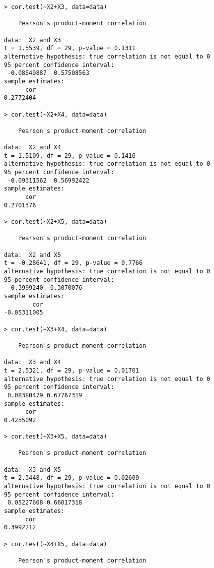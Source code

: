 \begin{enumerate}
\begin{lstlisting}
> cor.test(~X2+X3, data=data)

	Pearson's product-moment correlation

data:  X2 and X3
t = 1.5539, df = 29, p-value = 0.1311
alternative hypothesis: true correlation is not equal to 0
95 percent confidence interval:
 -0.08549887  0.57508563
sample estimates:
      cor 
0.2772404 

> cor.test(~X2+X4, data=data)

	Pearson's product-moment correlation

data:  X2 and X4
t = 1.5109, df = 29, p-value = 0.1416
alternative hypothesis: true correlation is not equal to 0
95 percent confidence interval:
 -0.09311562  0.56992422
sample estimates:
      cor 
0.2701376 

> cor.test(~X2+X5, data=data)

	Pearson's product-moment correlation

data:  X2 and X5
t = -0.28641, df = 29, p-value = 0.7766
alternative hypothesis: true correlation is not equal to 0
95 percent confidence interval:
 -0.3999240  0.3070076
sample estimates:
        cor 
-0.05311005 

> cor.test(~X3+X4, data=data)

	Pearson's product-moment correlation

data:  X3 and X4
t = 2.5321, df = 29, p-value = 0.01701
alternative hypothesis: true correlation is not equal to 0
95 percent confidence interval:
 0.08380479 0.67767319
sample estimates:
      cor 
0.4255092 

> cor.test(~X3+X5, data=data)

	Pearson's product-moment correlation

data:  X3 and X5
t = 2.3448, df = 29, p-value = 0.02609
alternative hypothesis: true correlation is not equal to 0
95 percent confidence interval:
 0.05227608 0.66017318
sample estimates:
      cor 
0.3992212 

> cor.test(~X4+X5, data=data)

	Pearson's product-moment correlation


\end{lstlisting}
\end{enumerate}
